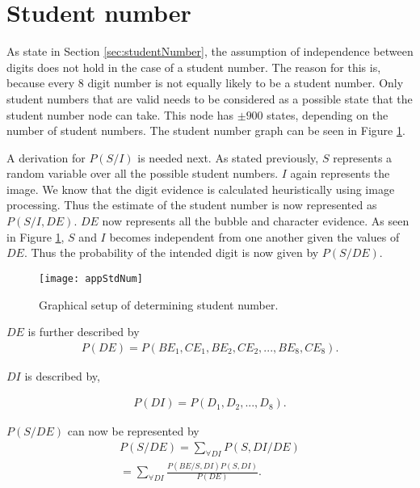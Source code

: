 \section{Student number}
As state in Section \ref{sec:studentNumber}, the assumption of independence between digits does not hold in the case of a student number. The reason for this is, because every 8 digit number is not equally likely to be a student number. Only student numbers that are valid needs to be considered as a possible state that the student number node can take. This node has $\pm 900$ states, depending on the number of student numbers. The student number graph can be seen in Figure \ref{fig:stdNum}. 

A derivation for $P(S/I)$ is needed next. As stated previously, $S$ represents a random variable over all the possible student numbers. $I$ again represents the image. We know that the digit evidence is calculated heuristically using image processing. Thus the estimate of the student number is now represented as $P(S/I,DE)$. $DE$ now represents all the bubble and character evidence. As seen in Figure \ref{fig:stdNum}, $S$ and $I$ becomes independent from one another given the values of $DE$. Thus the probability of the intended digit is now given by $P(S/DE)$.

\begin{figure}
  \centering
  \texttt{[image: appStdNum]}\\
  \caption{Graphical setup of determining student number.}
  \label{fig:stdNum}
\end{figure}

$DE$ is further described by 
\begin{align}
  P(DE) =  P(BE_1,CE_1,BE_2,CE_2,...,BE_8,CE_8).
\label{eqn:ansIndep}
\end{align}

$DI$ is described by,

\begin{align}
  P(DI) =  P(D_1,D_2,...,D_8).
\label{eqn:ansIndep2}
\end{align}

$P(S/DE)$ can now be represented by
\begin{align}
  P(S/DE)	=  \sum_{\forall DI}^{}  P(S,DI/DE)\\
  					=  \sum_{\forall DI}^{}  \frac{P(BE/S,DI)P(S,DI)}{P(DE)}.
\label{eqn:stdEqn2}
\end{align}

